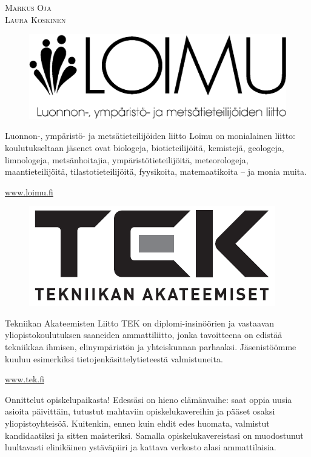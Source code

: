 \documentclass[a5paper, 8pt, twocolumn]{book} %
\numberwithin{equation}{section}
\begin{document}
\vspace{0.5cm}\noindent\textsc{Markus Oja}\\
\textsc{Laura Koskinen}

\clearpage
\begin{figure}[h!]
	\includegraphics[width=\columnwidth]{4500-LOIMU_log_tekstill_nega.eps}
\end{figure}
Luonnon-, ympäristö- ja metsätieteilijöiden liitto Loimu on monialainen liitto: koulutukseltaan jäsenet ovat biologeja, biotieteilijöitä, kemistejä, geologeja, limnologeja, metsänhoitajia, ympäristötieteilijöitä, meteorologeja, maantieteilijöitä, tilastotieteilijöitä, fyysikoita, matemaatikoita -- ja monia muita.

\url{www.loimu.fi}
\newpage
\begin{figure}[h!]
	\includegraphics[width=\columnwidth]{tek_logo.png}
\end{figure}
Tekniikan Akateemisten Liitto TEK on
diplomi-insinöörien ja vastaavan yliopistokoulutuksen
saaneiden ammattiliitto, jonka
tavoitteena on edistää tekniikkaa ihmisen,
elinympäristön ja yhteiskunnan parhaaksi.
Jäsenistöömme kuuluu esimerkiksi tietojenkäsittelytieteestä
valmistuneita.

\url{www.tek.fi}

Onnittelut opiskelupaikasta! Edessäsi
on hieno elämänvaihe: saat oppia uusia
asioita päivittäin, tutustut mahtaviin opiskelukavereihin
ja pääset osaksi yliopistoyhteisöä.
Kuitenkin, ennen kuin ehdit edes
huomata, valmistut kandidaatiksi ja sitten
maisteriksi. Samalla opiskelukavereistasi
on muodostunut luultavasti elinikäinen ystäväpiiri
ja kattava verkosto alasi ammattilaisia.
\end{document}
